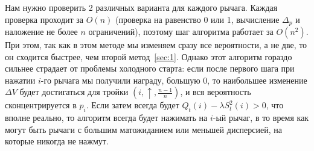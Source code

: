 \documentclass{article}
\begin{document}
\begin{enumerate}
     Нам нужно проверить 2 различных варианта для каждого рычага. Каждая проверка проходит за $O(n)$ (проверка на равенство 0 или 1, вычисление $\Delta_p$ и наложение не более $n$ ограничений), поэтому шаг алгоритма работает за $O(n^2)$. При этом, так как в этом методе мы изменяем сразу все вероятности, а не две, то он сходится быстрее, чем второй метод~\autoref{sec:1}. Однако этот алгоритм гораздо сильнее страдает от проблемы холодного старта: если после первого шага при нажатии $i$-го рычага мы получили награду, большую 0, то наибольшее изменение $\Delta V$ будет достигаться для тройки $(i, \uparrow, \frac{n-1}{n})$, и вся вероятность сконцентрируется в $p_i$. Если затем всегда будет $Q_t(i) - \lambda S_t^2(i) > 0$, что вполне реально, то алгоритм всегда будет нажимать на $i$-ый рычаг, в то время как могут быть рычаги с большим матожиданием или меньшей дисперсией, на которые никогда не нажмут.


\end{enumerate}
\end{document}
